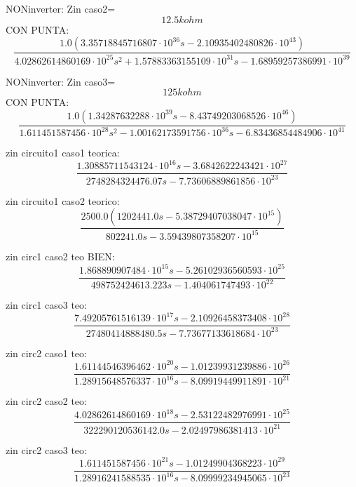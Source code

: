 NONinverter: Zin caso2=
\begin{equation}
12.5kohm
\end{equation}
CON PUNTA:
\begin{equation}
\frac{1.0 \left(3.35718845716807 \cdot 10^{36} s - 2.10935402480826 \cdot 10^{43}\right)}{4.02862614860169 \cdot 10^{25} s^{2} + 1.57883363155109 \cdot 10^{31} s - 1.68959257386991 \cdot 10^{39}}
\end{equation}

NONinverter: Zin caso3=
\begin{equation}
125kohm
\end{equation}
CON PUNTA:
\begin{equation}
\frac{1.0 \left(1.34287632288 \cdot 10^{39} s - 8.43749203068526 \cdot 10^{46}\right)}{1.611451587456 \cdot 10^{28} s^{2} - 1.00162173591756 \cdot 10^{36} s - 6.83436854484906 \cdot 10^{41}}
\end{equation}

zin circuito1 caso1 teorica:
\begin{equation}
\frac{1.30885711543124 \cdot 10^{16} s - 3.6842622243421 \cdot 10^{27}}{2748284324476.07 s - 7.73606889861856 \cdot 10^{23}}
\end{equation}

zin circuito1 caso2 teorico:
\begin{equation}
\frac{2500.0 \left(1202441.0 s - 5.38729407038047 \cdot 10^{15}\right)}{802241.0 s - 3.59439807358207 \cdot 10^{15}}
\end{equation}

zin circ1 caso2 teo BIEN:
\begin{equation}
\frac{1.868890907484 \cdot 10^{15} s - 5.26102936560593 \cdot 10^{25}}{498752424613.223 s - 1.404061747493 \cdot 10^{22}}
\end{equation}

zin circ1 caso3 teo:
\begin{equation}
\frac{7.49205761516139 \cdot 10^{17} s - 2.10926458373408 \cdot 10^{28}}{27480414888480.5 s - 7.73677133618684 \cdot 10^{23}}
\end{equation}


zin circ2 caso1 teo:
\begin{equation}
\frac{1.61144546396462 \cdot 10^{20} s - 1.01239931239886 \cdot 10^{26}}{1.28915648576337 \cdot 10^{16} s - 8.09919449911891 \cdot 10^{21}}
\end{equation}

zin circ2 caso2 teo:
\begin{equation}
\frac{4.02862614860169 \cdot 10^{18} s - 2.53122482976991 \cdot 10^{25}}{322290120536142.0 s - 2.02497986381413 \cdot 10^{21}}
\end{equation}


zin circ2 caso3 teo:
\begin{equation}
\frac{1.611451587456 \cdot 10^{21} s - 1.01249904368223 \cdot 10^{29}}{1.28916241588535 \cdot 10^{16} s - 8.09999234945065 \cdot 10^{23}}
\end{equation}

